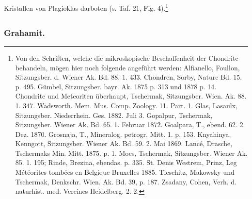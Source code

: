 \documentclass[a4paper, 11pt, oneside, polutonikogreek, german]{article}
\begin{document}
Kristallen von Plagioklas darboten (s. Taf. 21, Fig. 4).\footnote{Von den Schriften, welche die mikroskopische Beschaffenheit der Chondrite behandeln, mögen hier noch folgende angeführt werden: Alfianello, Foullon, Sitzungsber. d. Wiener Ak. Bd. 88. 1. 433. Chondren, Sorby, Nature Bd. 15. p. 495. Gümbel, Sitzungsber. bayr. Ak. 1875 p. 313 und 1878 p. 14. Chondrite und Meteoriten überhaupt, Tschermak, Sitzungsber. Wien. Ak. 88. 1. 347. Wadsworth. Mem. Mus. Comp. Zoology. 11. Part. 1. Glas, Lasaulx, Sitzungsber. Niederrhein. Ges. 1882. Juli 3. Gopalpur, Tschermak, Sitzungsber. Wiener Ak. Bd. 65. 1. Februar 1872. Goalpara, T., ebend. 62. 2. Dez. 1870. Grosnaja, T., Mineralog. petrogr. Mitt. 1. p. 153. Knyahinya, Kenngott, Sitzungsber. Wiener Ak. Bd. 59. 2. Mai 1869. Lancé, Drasche, Tschermaks Min. Mitt. 1875. p. 1. Mocs, Tschermak, Sitzungsber. Wiener Ak. 85. 1. 195; Rinde, Brezina, ebendas. p. 335. St. Denis Westrem, Prinz, Leg Météorites tombées en Belgique Bruxelles 1885. Tieschitz, Makowsky und Tschermak, Denkschr. Wien. Ak. Bd. 39, p. 187. Zsadany, Cohen, Verh. d. naturhist. med. Vereines Heidelberg. 2. 2.}
\clearpage
\subsection{}
\subsubsection{Grahamit.}
\end{document}
